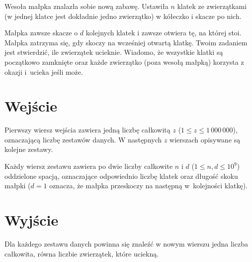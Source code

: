 \documentclass{spiral-kurs}
\begin{document}
\makeheader
%
    Wesoła małpka znalazła sobie nową zabawę. Ustawiła $n$ klatek ze zwierzątkami
    (w jednej klatce jest dokładnie jedno zwierzątko) w kółeczko i skacze po nich.

    Małpka zawsze skacze o $d$ kolejnych klatek i zawsze otwiera tę, na której stoi.
    Małpka zatrzyma się, gdy skoczy na wcześniej otwartą klatkę.
    Twoim zadaniem jest stwierdzić, ile zwierzątek ucieknie.
    Wiadomo, że wszystkie klatki są początkowo zamknięte oraz każde zwierzątko
    (poza wesołą małpką) korzysta z okazji i~ucieka jeśli może.

  \section{Wejście}
    Pierwszy wiersz wejścia zawiera jedną liczbę całkowitą $z$ ($1 \leq z \leq 1\,000\,000$),
    oznaczającą liczbę zestawów danych.
    W następnych $z$ wierszach opisywane są kolejne zestawy.

    Każdy wiersz zestawu zawiera po dwie liczby całkowite $n$ i $d$ ($1 \leq n, d \leq 10^9$)
    oddzielone spacją, oznaczające odpowiednio liczbę klatek oraz długość skoku małpki
    ($d = 1$ oznacza, że małpka przeskoczy na następną w~kolejności klatkę).

  \section{Wyjście}
    Dla każdego zestawu danych powinna się znaleźć w nowym wierszu jedna liczba całkowita,
    równa liczbie zwierzątek, które uciekną.


  
\end{document}
